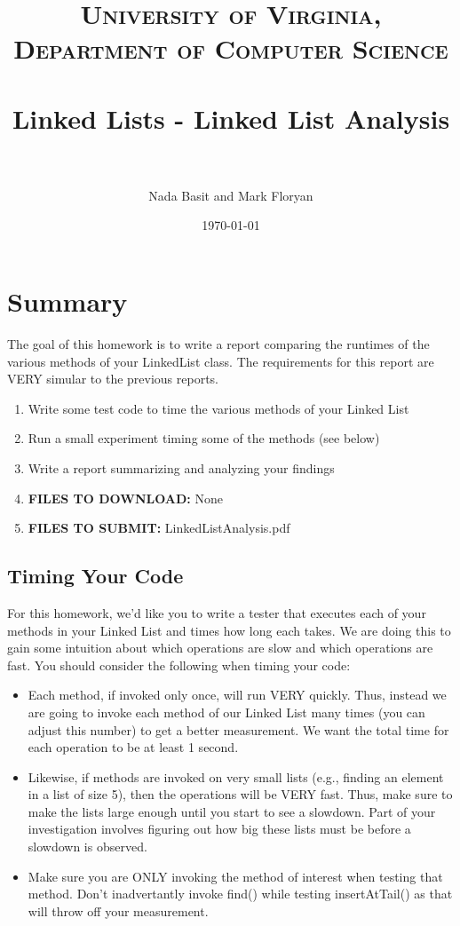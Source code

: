\documentclass[paper=a4, fontsize=11pt, parskip=full]{scrartcl} %
\title{
\normalfont \normalsize
\textsc{University of Virginia, Department of Computer Science} \\ [25pt] %
\horrule{0.5pt} \\[0.4cm] %
\huge Linked Lists - Linked List Analysis \\ %
\horrule{2pt} \\[0.5cm] %
}
\author{Nada Basit and Mark Floryan}
\date{\normalsize\today} %
\numberwithin{equation}{section} %
\numberwithin{figure}{section} %
\numberwithin{table}{section} %
\begin{document}
\maketitle %



\section{Summary}

The goal of this homework is to write a report comparing the runtimes of the various methods of your LinkedList class. The requirements for this report are VERY simular to the previous reports.

\begin{enumerate}
	\item Write some test code to time the various methods of your Linked List
	\item Run a small experiment timing some of the methods (see below)
	\item Write a report summarizing and analyzing your findings
	\item \textbf{FILES TO DOWNLOAD:} None
	\item \textbf{FILES TO SUBMIT:} LinkedListAnalysis.pdf
\end{enumerate}

\subsection{Timing Your Code}

For this homework, we'd like you to write a tester that executes each of your methods in your Linked List and times how long each takes. We are doing this to gain some intuition about which operations are slow and which operations are fast. You should consider the following when timing your code:

\begin{itemize}
	\item Each method, if invoked only once, will run VERY quickly. Thus, instead we are going to invoke each method of our Linked List many times (you can adjust this number) to get a better measurement. We want the total time for each operation to be at least 1 second.
	\item Likewise, if methods are invoked on very small lists (e.g., finding an element in a list of size 5), then the operations will be VERY fast. Thus, make sure to make the lists large enough until you start to see a slowdown. Part of your investigation involves figuring out how big these lists must be before a slowdown is observed.
	\item Make sure you are ONLY invoking the method of interest when testing that method. Don't inadvertantly invoke find() while testing insertAtTail() as that will throw off your measurement.
\end{itemize}
\end{document}
